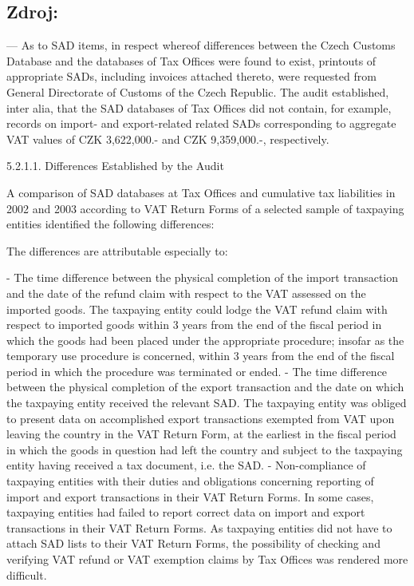 \documentclass[10pt]{article}
\begin{document}
\subsection*{Zdroj:}

— As to SAD items, in respect whereof differences between the Czech Customs Database and the databases of Tax Offices were found to exist, printouts of appropriate SADs, including invoices attached thereto, were requested from General Directorate of Customs of the Czech Republic.
The audit established, inter alia, that the SAD databases of Tax Offices did not contain, for example, records on import- and export-related related SADs corresponding to aggregate VAT values of CZK 3,622,000.- and CZK 9,359,000.-, respectively.


5.2.1.1. Differences Established by the Audit



A comparison of SAD databases at Tax Offices and cumulative tax liabilities in 2002 and 2003 according to VAT Return Forms of a selected sample of taxpaying entities identified the following differences:



The differences are attributable especially to:

- The time difference between the physical completion of the import transaction and the date of the refund claim with respect to the VAT assessed on the imported goods.
The taxpaying entity could lodge the VAT refund claim with respect to imported goods within 3 years from the end of the fiscal period in which the goods had been placed under the appropriate procedure; insofar as the temporary use procedure is concerned, within 3 years from the end of the fiscal period in which the procedure was terminated or ended.
- The time difference between the physical completion of the export transaction and the date on which the taxpaying entity received the relevant SAD.
The taxpaying entity was obliged to present data on accomplished export transactions exempted from VAT upon leaving the country in the VAT Return Form, at the earliest in the fiscal period in which the goods in question had left the country and subject to the taxpaying entity having received a tax document, i.e. the SAD.
- Non-compliance of taxpaying entities with their duties and obligations concerning reporting of import and export transactions in their VAT Return Forms.
In some cases, taxpaying entities had failed to report correct data on import and export transactions in their VAT Return Forms.
As taxpaying entities did not have to attach SAD lists to their VAT Return Forms, the possibility of checking and verifying VAT refund or VAT exemption claims by Tax Offices was rendered more difficult.
\end{document}
